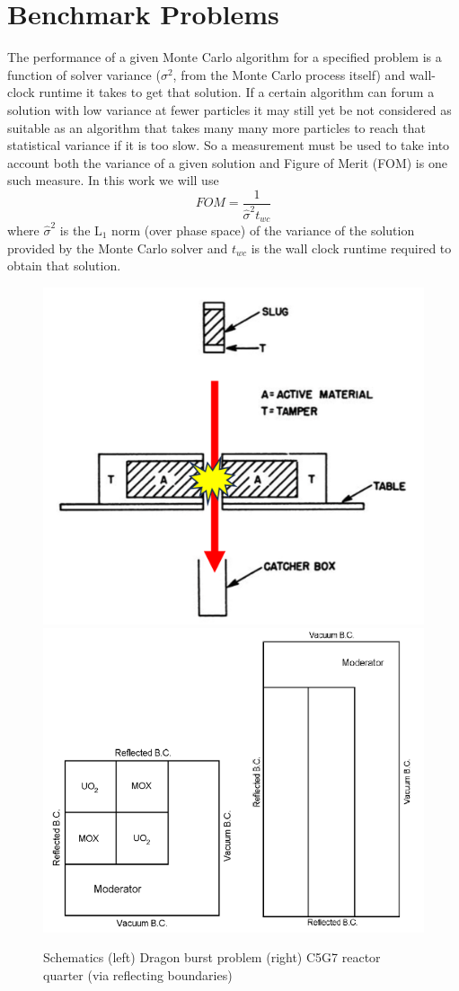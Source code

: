 \section{Benchmark Problems}
\label{sec:benchmarks}

The performance of a given Monte Carlo algorithm for a specified problem is a function of solver variance ($\sigma^2$, from the Monte Carlo process itself) and wall-clock runtime it takes to get that solution.
If a certain algorithm can forum a solution with low variance at fewer particles it may still yet be not considered as suitable as an algorithm that takes many many more particles to reach that statistical variance if it is too slow.
So a measurement must be used to take into account both the variance of a given solution and Figure of Merit (FOM) is one such measure. In this work we will use 
\begin{equation}
    FOM = \frac{1}{\hat{\sigma}^2 t_{wc}}
\end{equation}
where $\hat{\sigma}^2$ is the L$_{1}$ norm (over phase space) of the variance of the solution provided by the Monte Carlo solver and $t_{wc}$ is the wall clock runtime required to obtain that solution.

\begin{figure}
    \centering
    \includegraphics[width=0.48\linewidth]{monte_carlo/delta_tracking/figures/dragon.png}
    \includegraphics[width=0.48\linewidth]{monte_carlo/delta_tracking/figures/c5g7.png}
    \caption{Schematics (left) Dragon burst problem \cite{kimpland2021dragon} (right) C5G7 reactor quarter (via reflecting boundaries) \cite{jia_hou_oecdnea_2017}}
    \label{fig:schems}
\end{figure}


